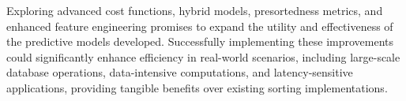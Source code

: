 \documentclass[twocolumn]{article}
\begin{document}
Exploring advanced cost functions, hybrid models, presortedness metrics, and enhanced feature engineering promises to expand the utility and effectiveness of the predictive models developed. Successfully implementing these improvements could significantly enhance efficiency in real-world scenarios, including large-scale database operations, data-intensive computations, and latency-sensitive applications, providing tangible benefits over existing sorting implementations.



\end{document}
